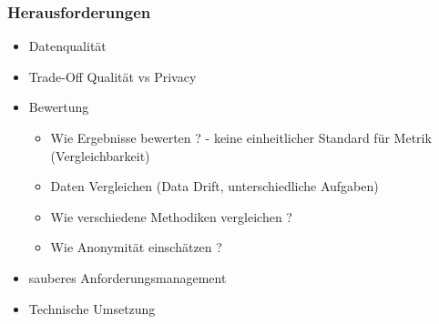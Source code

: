 \documentclass[
	11pt, %
]{beamer}
\begin{document}
\begin{frame}
    \frametitle{Herausforderungen}
    \begin{itemize}
        \item Datenqualität
        \item Trade-Off Qualität vs Privacy
        \item Bewertung
        \begin{itemize}
            \item Wie Ergebnisse bewerten ? - keine einheitlicher Standard für Metrik (Vergleichbarkeit) \parencite{escudie_evaluating_2026}
            \item Daten Vergleichen (Data Drift, unterschiedliche Aufgaben) %
            \item Wie verschiedene Methodiken vergleichen ? %
            \item Wie Anonymität einschätzen ? %
        \end{itemize}
        \item sauberes Anforderungsmanagement %
        \item Technische Umsetzung 
    \end{itemize}
\end{frame}
\end{document}
